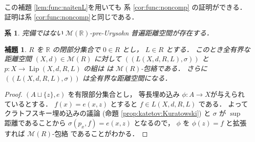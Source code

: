 \documentclass[leqno, 12pt]{jsarticle}
\newtheorem{cor}[thm]{系}
\newtheorem{lem}[thm]{補題}
\newcommand{\rr}{\mathbb{R}}
\DeclareMathOperator{\lip}{Lip}
\begin{document}
この補題
 \ref{lem:func:naitenL}を用いても
 系 
 \ref{cor:func:noncomp}
の証明ができる．
証明は系 \ref{cor:func:noncomp}と同じである．
\begin{cor}\label{cor:noncomp2}
完備ではない
$\mathscr{M}(\rr)$-pre-Urysohn
普遍距離空間が存在する．
\end{cor}


\begin{lem}\label{lem:func:Lenv}
$R$
を
$\rr$
の閉部分集合で
$0\in R$
とし，
$L\in R$
とする．
このとき全有界な距離空間
$(X, d)\in \mathscr{M}(R)$
に対して
$((L(X, d, R, L), \sigma))$
と
$p\colon  X\to \lip(X, d, R, L)$
の組は
は
$\mathscr{M}(R)$-包絡である．
さらに
$((L(X, d, R, L), \sigma))$
は全有界な距離空間になる．
\end{lem}
\begin{proof}
$(A\sqcup\{z\}, e)$
を有限部分集合とし，
等長埋め込み
$\phi\colon  A\to X$が与えられているとする．
$f(x)=e(x, z)$
とすると
$f\in L(X, d, R, L)$
である．
よってクラトフスキー埋め込みの議論 
(命題 
\ref{prop:katetov:Kuratowski})
と
$\sigma$
が
$\sup$
距離であることから
$\sigma(p_{x}, f)=e(x, z)$
となるので，
$\phi$
を
$\phi(z)=f$
と拡張すれば
$\mathscr{M}(R)$-包絡
であることがわかる．
\end{proof}






\end{document}
